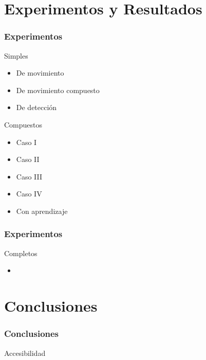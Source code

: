 \documentclass{beamer}
\begin{document}
\section{Experimentos y Resultados}
\begin{frame}
  \frametitle{Experimentos}
  
  \begin{block}{Simples}
		\begin{itemize}
		\item De movimiento
		\item De movimiento compuesto 
		\item De detecci\'on
 		\end{itemize}
	   \end{block}
\begin{block}{Compuestos}
	\begin{itemize}
		\item Caso I
		\item Caso II
		\item Caso III
		\item Caso IV
		\item Con aprendizaje
	\end{itemize}
\end{block}
\end{frame}

\begin{frame}
\frametitle{Experimentos}
\begin{block}{Completos}
	\begin{itemize}
		\item 
		
	\end{itemize}
\end{block}
\end{frame}

\section{Conclusiones}
\begin{frame}
\frametitle{Conclusiones}
\begin{block}{Accesibilidad}

\end{block}


\end{frame}
\end{document}
